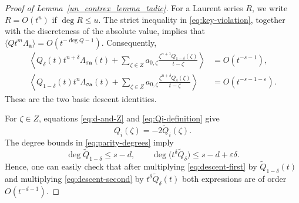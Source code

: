\documentclass[10pt,a4paper]{amsart}
\begin{document}
\begin{proof}[Proof of Lemma~\ref{un_contrex_lemma_tadic}]

For a Laurent series $R$, we write $R=O(t^u)$ if $\deg R\leq u$. The
strict inequality in \eqref{eq:key-violation}, together with the
discreteness of the absolute value, implies that $\langle
Qt^m\Lambda_{\mathbf a}\rangle =O(t^{-\deg Q-1})$. Consequently,
\begin{align}
 \left\langle
 Q_\delta(t)t^{n+\delta}\Lambda_{\sigma\mathbf a}(t)
 +
 \sum_{\zeta\in Z}
 a_{0,\zeta}
 \frac{\zeta^{n+1}Q_{1-\delta}(\zeta)}
      {t-\zeta}
 \right\rangle
 &=O(t^{-s-1}),
 \label{eq:descent-first}
 \\
 \left\langle
 Q_{1-\delta}(t)t^n\Lambda_{\sigma\mathbf a}(t)
 +
 \sum_{\zeta\in Z}
 a_{0,\zeta}
 \frac{\zeta^{n+\delta}Q_\delta(\zeta)}
      {t-\zeta}
 \right\rangle
 &=O(t^{-s-1-\varepsilon}).
 \label{eq:descent-second}
\end{align}
These are the two basic descent identities.

For $\zeta\in Z$, equations \eqref{eq:d-and-Z} and
\eqref{eq:Qi-definition} give
\begin{equation} \label{eq:Qi-at-zeta}
 Q_i(\zeta)=-2\widetilde Q_i(\zeta).
\end{equation}
The degree bounds in \eqref{eq:parity-degrees} imply
\[
 \deg\widetilde Q_{1-\delta}\leq s-d,
 \qquad
 \deg\bigl(t^\delta\widetilde Q_\delta\bigr)
 \leq s-d+\varepsilon\delta.
\]
Hence, one can easily check that after multiplying
\eqref{eq:descent-first} by $\widetilde Q_{1-\delta}(t)$
and multiplying \eqref{eq:descent-second} by $t^\delta\widetilde
Q_\delta(t)$ both expressions are of order $O(t^{-d-1})$.


\end{proof}
\end{document}
